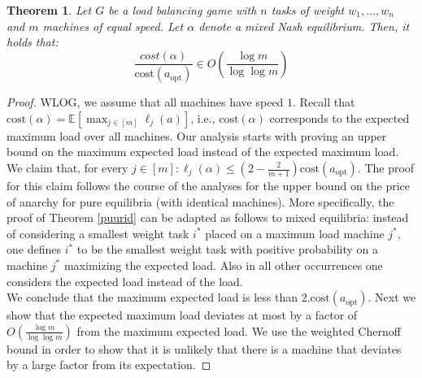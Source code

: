 \documentclass[a4paper,11pt]{article}
\newtheorem{theorem}{Theorem}[section]
\newcommand{\E}{{\mathbb E}}
\newcommand{\cost}{\text{cost}}
\newcommand{\opt}{\text{opt}}
\newcommand{\copt}{\cost(a_{\opt})}
\begin{document}
\begin{theorem}
Let $G$ be a load balancing game with $n$ tasks of weight $w_1,...,w_n$ and $m$ machines of equal speed. Let $\alpha$ denote a mixed Nash equilibrium. Then, it holds that:
$$\frac{cost(\alpha)}{\cost(a_{\opt})} \in O\left(\frac{\log m}{\log \log m}\right)$$
\end{theorem}

\begin{proof}
WLOG, we assume that all machines have speed $1$. Recall that $\cost(\alpha)=\E[\max_{j\in[m]}{\ell_j(a)}]$, i.e., $\cost(\alpha)$ corresponds to the expected maximum load over all machines. Our analysis starts with proving an upper bound on the maximum expected load instead of the expected maximum load.\\

We claim that, for every $j \in [m]: \ell_j(\alpha) \leq (2- \frac{2}{m+1})\copt$. The proof for this claim follows the course of the analyses for the upper bound on the price of anarchy for pure equilibria (with identical machines). More specifically, the proof of Theorem \ref{puurid} can be adapted as follows to mixed equilibria: instead of considering a smallest weight task $i^*$ placed on a maximum load machine $j^*$, one defines $i^*$ to be the smallest weight task with positive probability on a machine $j^*$ maximizing the expected load. Also in all other occurrences one considers the expected load instead of the load.\\

We conclude that the maximum expected load is less than $2.\copt$. Next we show that the expected maximum load deviates at most by a factor of $O(\frac{\log m}{\log \log m})$ from the maximum expected load. We use the weighted Chernoff bound in order to show that it is unlikely that there is a machine that deviates by a large factor from its expectation.


\end{proof}
\end{document}
